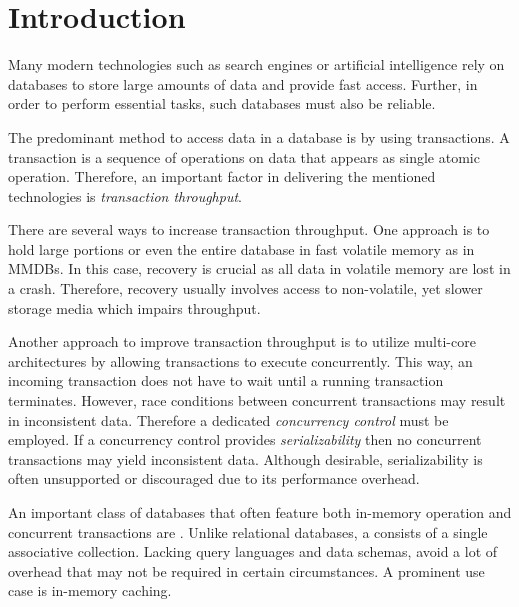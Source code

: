 \chapter{Introduction}
\label{ch:intro}



Many modern technologies such as search engines or artificial intelligence rely
on databases to store large amounts of data and provide fast access. Further, in
order to perform essential tasks, such databases must also be reliable.

The predominant method to access data in a database is by using transactions. A
transaction is a sequence of operations on data that appears as single atomic
operation. Therefore, an important factor in delivering the mentioned
technologies is \textit{transaction throughput}.

There are several ways to increase transaction throughput. One approach is to
hold large portions or even the entire database in fast volatile memory as in
\acp{MMDB}. In this case, recovery is crucial as all data in volatile memory are
lost in a crash. Therefore, recovery usually involves access to non-volatile,
yet slower storage media which impairs throughput.

Another approach to improve transaction throughput is to utilize multi-core
architectures by allowing transactions to execute concurrently. This way, an
incoming transaction does not have to wait until a running transaction
terminates. However, race conditions between concurrent transactions may result
in inconsistent data. Therefore a dedicated \textit{concurrency control} must be
employed. If a concurrency control provides \textit{serializability} then no
concurrent transactions may yield inconsistent data. Although desirable,
serializability is often unsupported or discouraged due to its performance
overhead.

An important class of databases that often feature both in-memory operation and
concurrent transactions are \textit{\kvsp}. Unlike relational databases, a \kvs
consists of a single associative collection. Lacking query languages and data
schemas, \kvsp avoid a lot of overhead that may not be required in certain
circumstances. A prominent use case is in-memory caching.


